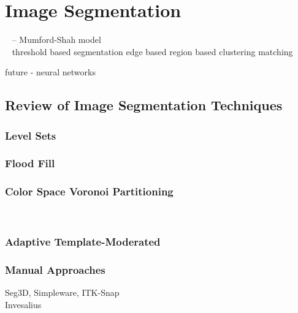 \chapter{Image Segmentation}
%

~\cite{morel} -- Mumford-Shah model\\
~\cite{mitiche}
threshold based segmentation
edge based
region based
clustering
matching

future - neural networks

\section{Review of Image Segmentation Techniques}
\label{Review of Image Segmentation Techniques}
\subsection{Level Sets}
\label{Level Sets}

\subsection{Flood Fill}
\label{Flood Fill}
\subsection{Color Space Voronoi Partitioning}
\label{Color Space Voronoi Partitioning}
~\cite{lcevt}
\subsection{Adaptive Template-Moderated}
\label{Adaptive Template-Moderated}
\subsection{Manual Approaches}
\label{Manual Approaches}
Seg3D, Simpleware, ITK-Snap \\
Invesalius

